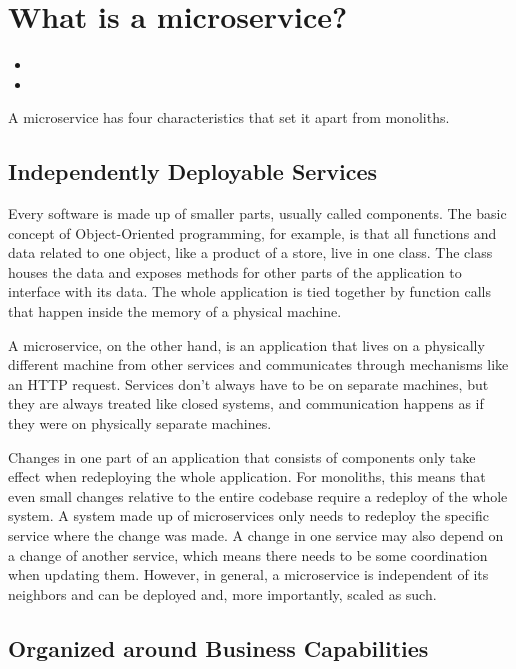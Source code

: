 \section{What is a microservice?}


\begin{itemize}
  \item {}
  \item {}
\end{itemize}

A microservice has four characteristics that set it apart from monoliths.

\subsection{Independently Deployable Services}

Every software is made up of smaller parts, usually called components. The basic concept of Object-Oriented programming, for example, is that all functions and data related to one object, like a product of a store, live in one class. The class houses the data and exposes methods for other parts of the application to interface with its data. The whole application is tied together by function calls that happen inside the memory of a physical machine.

A microservice, on the other hand, is an application that lives on a physically different machine from other services and communicates through mechanisms like an HTTP request. Services don't always have to be on separate machines, but they are always treated like closed systems, and communication happens as if they were on physically separate machines.

Changes in one part of an application that consists of components only take effect when redeploying the whole application. For monoliths, this means that even small changes relative to the entire codebase require a redeploy of the whole system. A system made up of microservices only needs to redeploy the specific service where the change was made. A change in one service may also depend on a change of another service, which means there needs to be some coordination when updating them. However, in general, a microservice is independent of its neighbors and can be deployed and, more importantly, scaled as such.


\subsection{Organized around Business Capabilities}

